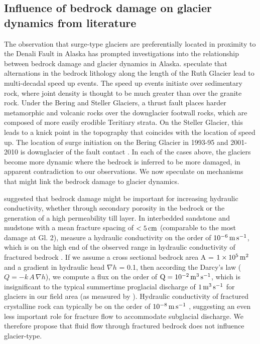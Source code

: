 \documentclass[review]{igs}
\begin{document}
\subsection{Influence of bedrock damage on glacier dynamics from literature}

The observation that surge-type glaciers are preferentially located in proximity to the Denali Fault in Alaska \citep{Post1969} has prompted investigations into the relationship between bedrock damage and glacier dynamics in Alaska. \cite{Turrin2014} speculate that alternations in the bedrock lithology along the length of the Ruth Glacier lead to multi-decadal speed up events. The speed up events initiate over sedimentary rock, where joint density is thought to be much greater than over the granite rock. Under the Bering and Steller Glaciers, a thrust fault places harder metamorphic and volcanic rocks over the downglacier footwall rocks, which are composed of more easily erodible Teritiary strata. On the Steller Glacier, this leads to a knick point in the topography that coincides with the location of speed up. The location of surge initiation on the Bering Glacier in 1993-95 \citep{Fatland2002,Roush2003} and 2001-2010 \citep{Turrin2013} is downglacier of the fault contact \citep{Bruhn2010,Turrin2013}. In each of the cases above, the glaciers become more dynamic where the bedrock is inferred to be more damaged, in apparent contradiction to our observations. We now speculate on mechanisms that might link the bedrock damage to glacier dynamics. 

\cite{Post1969} suggested that bedrock damage might be important for increasing hydraulic conductivity, whether through secondary porosity in the bedrock or the generation of a high permeability till layer. In interbedded sandstone and mudstone with a mean fracture spacing of $\rm <5\,cm$ (comparable to the most damage at Gl. 2), \cite{Surrette2008} measure a hydraulic conductivity on the order of $\rm 10^{-6}\,m\,s^{-1}$, which is on the high end of the observed range in hydraulic conductivity of fractured bedrock \citep{Domenico1998}. If we assume a cross sectional bedrock area A = $\rm 1\times 10^5\,m^2$ and a gradient in hydraulic head $\nabla h$ = 0.1, then according the Darcy's law ($Q = -k\,A\,\nabla h$), we compute a flux on the order of  $\rm Q = 10^{-2}\,m^3\,s^{-1}$, which is insignificant to the typical summertime proglacial discharge of $\rm 1\,m^3\,s^{-1}$ for glaciers in our field area (as measured by \cite{Crompton2016}). Hydraulic conductivity of fractured crystalline rock can typically be on the order of $\rm 10^{-8}\,m\,s^{-1}$ \citep{Singhal2010}, suggesting an even less important role for fracture flow to accommodate subglacial discharge. We therefore propose that fluid flow through fractured bedrock does not influence glacier-type.
\end{document}
